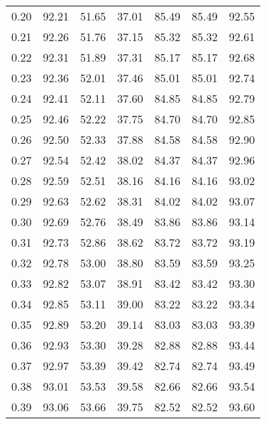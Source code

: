 \begin{tabular}{|c|c|c|c|c|c|c|}
      0.20 &     92.21 &     51.65 &      37.01 &   85.49 &      85.49 &         92.55 \\
      0.21 &     92.26 &     51.76 &      37.15 &   85.32 &      85.32 &         92.61 \\
      0.22 &     92.31 &     51.89 &      37.31 &   85.17 &      85.17 &         92.68 \\
      0.23 &     92.36 &     52.01 &      37.46 &   85.01 &      85.01 &         92.74 \\
      0.24 &     92.41 &     52.11 &      37.60 &   84.85 &      84.85 &         92.79 \\
      0.25 &     92.46 &     52.22 &      37.75 &   84.70 &      84.70 &         92.85 \\
      0.26 &     92.50 &     52.33 &      37.88 &   84.58 &      84.58 &         92.90 \\
      0.27 &     92.54 &     52.42 &      38.02 &   84.37 &      84.37 &         92.96 \\
      0.28 &     92.59 &     52.51 &      38.16 &   84.16 &      84.16 &         93.02 \\
      0.29 &     92.63 &     52.62 &      38.31 &   84.02 &      84.02 &         93.07 \\
      0.30 &     92.69 &     52.76 &      38.49 &   83.86 &      83.86 &         93.14 \\
      0.31 &     92.73 &     52.86 &      38.62 &   83.72 &      83.72 &         93.19 \\
      0.32 &     92.78 &     53.00 &      38.80 &   83.59 &      83.59 &         93.25 \\
      0.33 &     92.82 &     53.07 &      38.91 &   83.42 &      83.42 &         93.30 \\
      0.34 &     92.85 &     53.11 &      39.00 &   83.22 &      83.22 &         93.34 \\
      0.35 &     92.89 &     53.20 &      39.14 &   83.03 &      83.03 &         93.39 \\
      0.36 &     92.93 &     53.30 &      39.28 &   82.88 &      82.88 &         93.44 \\
      0.37 &     92.97 &     53.39 &      39.42 &   82.74 &      82.74 &         93.49 \\
      0.38 &     93.01 &     53.53 &      39.58 &   82.66 &      82.66 &         93.54 \\
      0.39 &     93.06 &     53.66 &      39.75 &   82.52 &      82.52 &         93.60 \\

\end{tabular}
